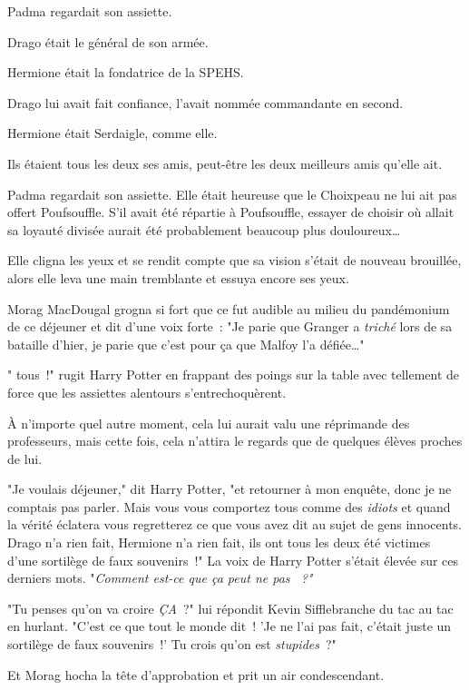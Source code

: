 Padma regardait son assiette.

Drago était le général de son armée.

Hermione était la fondatrice de la SPEHS.

Drago lui avait fait confiance, l'avait nommée commandante en second.

Hermione était Serdaigle, comme elle.

Ils étaient tous les deux ses amis, peut-être les deux meilleurs amis qu'elle ait.

Padma regardait son assiette. Elle était heureuse que le Choixpeau ne lui ait pas offert Poufsouffle. S'il avait été répartie à Poufsouffle, essayer de choisir où allait sa loyauté divisée aurait été probablement beaucoup plus douloureux…

Elle cligna les yeux et se rendit compte que sa vision s'était de nouveau brouillée, alors elle leva une main tremblante et essuya encore ses yeux.

Morag MacDougal grogna si fort que ce fut audible au milieu du pandémonium de ce déjeuner et dit d'une voix forte~: "Je parie que Granger a \emph{triché} lors de sa bataille d'hier, je parie que c'est pour ça que Malfoy l'a défiée…"

" tous~!" rugit Harry Potter en frappant des poings sur la table avec tellement de force que les assiettes alentours s'entrechoquèrent.

À n'importe quel autre moment, cela lui aurait valu une réprimande des professeurs, mais cette fois, cela n'attira le regards que de quelques élèves proches de lui.

"Je voulais déjeuner," dit Harry Potter, "et retourner à mon enquête, donc je ne comptais pas parler. Mais vous vous comportez tous comme des \emph{idiots} et quand la vérité éclatera vous regretterez ce que vous avez dit au sujet de gens innocents. Drago n'a rien fait, Hermione n'a rien fait, ils ont tous les deux été victimes d'une sortilège de faux souvenirs~!" La voix de Harry Potter s'était élevée sur ces derniers mots. "\emph{Comment est-ce que ça peut ne pas ~?"}

"Tu penses qu'on va croire \emph{ÇA}~?" lui répondit Kevin Sifflebranche du tac au tac en hurlant. "C'est ce que tout le monde dit~! 'Je ne l'ai pas fait, c'était juste un sortilège de faux souvenirs~!' Tu crois qu'on est \emph{stupides}~?"

Et Morag hocha la tête d'approbation et prit un air condescendant.


